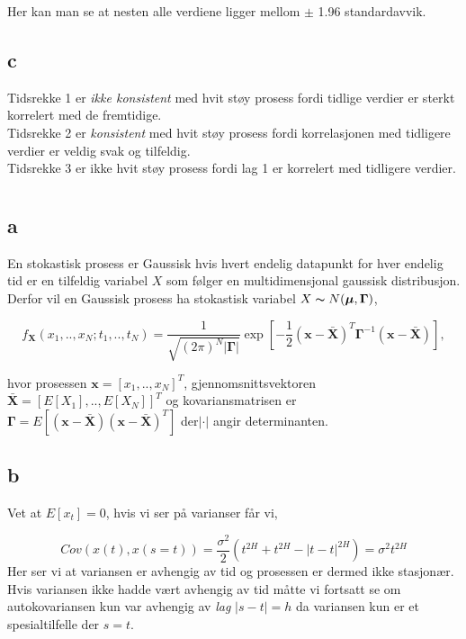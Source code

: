 \documentclass[12pt]{article}
\newcommand{\vect}[1]{\boldsymbol{#1}}
\begin{document}
{Her kan man se at nesten alle verdiene ligger mellom $\pm$ 1.96 standardavvik.



\subsection{c}
Tidsrekke 1 er \emph{ikke konsistent} med hvit støy prosess fordi tidlige verdier er sterkt korrelert med de fremtidige.
\\
Tidsrekke 2 er \emph{konsistent} med hvit støy prosess fordi korrelasjonen med tidligere verdier er veldig svak og tilfeldig.
\\
Tidsrekke 3 er ikke hvit støy prosess fordi lag 1 er korrelert med tidligere verdier.


\section{}
\subsection{a}

En stokastisk prosess er Gaussisk hvis hvert endelig datapunkt for hver endelig tid er en tilfeldig variabel $X$ som følger en multidimensjonal gaussisk distribusjon. Derfor vil en Gaussisk prosess ha stokastisk variabel $X \thicksim N(\vect{\mu},\vect{\Gamma})$,

\begin{equation}
  f_{\vect{X}}(x_{1},..,x_{N};t_{1},..,t_{N}) = \frac{1}{\sqrt{(2\pi)^{N} |\vect{\Gamma}|}}\exp\left[-\frac{1}{2}(\vect{x} - \vect{\bar{X}})^{T}\vect{\Gamma}^{-1}(\vect{x} - \vect{\bar{X}})  \right],
\end{equation}

hvor prosessen $\vect{x} = [x_{1},..,x_{N}]^{T}$, gjennomsnittsvektoren$\vect{\bar{X}} = [E[X_{1}],..,E[X_{N}]]^{T}$ og kovariansmatrisen er $\vect{\Gamma} = E[(\vect{x} - \vect{\bar{X}})(\vect{x} - \vect{\bar{X}})^{T}]$ der$|\cdot|$ angir determinanten.


\subsection{b}
Vet at $E[x_{t}] = 0$, hvis vi ser på varianser får vi,

\begin{equation*}
  Cov(x(t),x(s=t)) = \frac{\sigma^2}{2}(t^{2H} + t^{2H} - |t - t|^{2H}) = \sigma^2t^{2H}
\end{equation*}
Her ser vi at variansen er avhengig av tid og prosessen er dermed ikke stasjonær. Hvis variansen ikke hadde vært avhengig av tid måtte vi fortsatt se om autokovariansen kun var avhengig av \emph{lag} $|s - t| = h$ da variansen kun er et spesialtilfelle der $s = t$.



}
\end{document}
